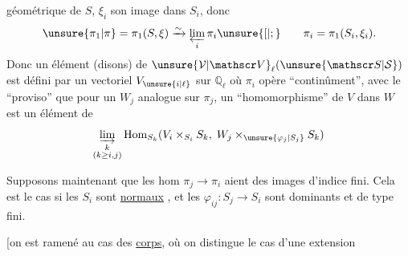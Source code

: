 géométrique de $S$, $\xi_i$ son image dans $S_i$, donc
\[
\unsure{\pi_1|\pi}=\pi_1(S,\xi)\xrightarrow{\sim}\varprojlim_i\pi_i\unsure{[|;}\qquad \pi_i=\pi_1(S_i,\xi_i).
\]
Donc un élément (disons) de $\unsure{\mathcal V|\mathscr V}_\ell(\unsure{\mathscr S|\mathcal S})$  est défini par un vectoriel $V_{\unsure{i|\ell}}$ sur $\mathbb Q_\ell$ où $\pi_i$ opère ``continûment'', avec le ``proviso'' que pour un $W_j$ analogue sur $\pi_j$, un ``homomorphisme'' de $V$ dans $W$ est un élément de
\[
\varinjlim_{\substack{k\\(k\geq i,j)}}\operatorname{Hom}_{S_k}(V_i\times_{S_i}S_k,\;W_j\times_{\unsure{\varphi_j|S_j}}S_k)
\]

\margin{\rule{0.4pt}{6\baselineskip}}
Supposons maintenant que  les  hom  $\pi_j\longrightarrow\pi_i$ aient des images d'indice fini. Cela est le cas si les $S_i$ sont \uline{normaux} , et les $\varphi_{ij}:S_j\longrightarrow S_i$ sont dominants et  de type fini.

[on est ramené au cas des \uline{corps}, où on distingue le cas d'une extension 
